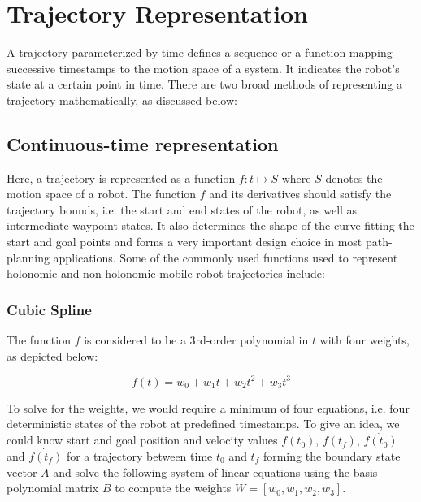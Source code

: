 \section{Trajectory Representation}\label{sec:trajectory_rep}

A trajectory parameterized by time defines a sequence or a function mapping successive timestamps to the motion space of a system. It indicates the robot's state at a certain point in time. There are two broad methods of representing a trajectory mathematically, as discussed below:

\subsection{Continuous-time representation}

Here, a trajectory is represented as a function $f: t\mapsto S$ where $S$ denotes the motion space of a robot. The function $f$ and its derivatives should satisfy the trajectory bounds, i.e. the start and end states of the robot, as well as intermediate waypoint states. It also determines the shape of the curve fitting the start and goal points and forms a very important design choice in most path-planning applications. Some of the commonly used functions used to represent holonomic and non-holonomic mobile robot trajectories include:

\subsubsection{Cubic Spline}

The function $f$ is considered to be a 3rd-order polynomial in $t$ with four weights, as depicted below:

\begin{equation}
f(t) = w_0 + w_1 t + w_2 t^2 + w_3 t^3
\label{eqn:cubic_spline}
\end{equation}

To solve for the weights, we would require a minimum of four equations, i.e. four deterministic states of the robot at predefined timestamps. To give an idea, we could know start and goal position and velocity values $f(t_0)$, $f(t_f)$, $\dot{f(t_0)}$ and $\dot{f(t_f)}$ for a trajectory between time $t_0$ and $t_f$ forming the boundary state vector $A$ and solve the following system of linear equations using the basis polynomial matrix $B$ to compute the weights $W = [w_0, w_1, w_2, w_3]$.

